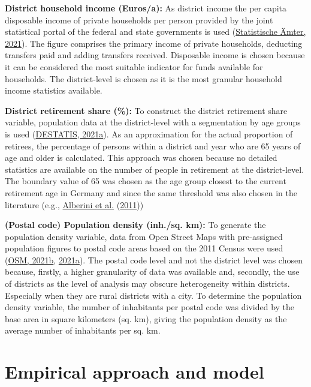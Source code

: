 \documentclass[12pt,twoside]{reedthesis}
\begin{document}
\textbf{District household income (Euros/a):} As district income the per capita disposable income of private households per person provided by the joint statistical portal of the federal and state governments is used (\protect\hyperlink{ref-statistischeamter21}{Statistische Ämter, 2021}). The figure comprises the primary income of private households, deducting transfers paid and adding transfers received. Disposable income is chosen because it can be considered the most suitable indicator for funds available for households. The district-level is chosen as it is the most granular household income statistics available.

\textbf{District retirement share (\%):} To construct the district retirement share variable, population data at the district-level with a segmentation by age groups is used (\protect\hyperlink{ref-destatis21c}{DESTATIS, 2021a}). As an approximation for the actual proportion of retirees, the percentage of persons within a district and year who are 65 years of age and older is calculated. This approach was chosen because no detailed statistics are available on the number of people in retirement at the district-level. The boundary value of 65 was chosen as the age group closest to the current retirement age in Germany and since the same threshold was also chosen in the literature (e.g., \protect\hyperlink{ref-alberini_etal11}{Alberini et al.} (\protect\hyperlink{ref-alberini_etal11}{2011}))

\textbf{(Postal code) Population density (inh./sq. km):} To generate the population density variable, data from Open Street Maps with pre-assigned population figures to postal code areas based on the 2011 Census were used (\protect\hyperlink{ref-osm21}{OSM, 2021b}, \protect\hyperlink{ref-osm21a}{2021a}). The postal code level and not the district level was chosen because, firstly, a higher granularity of data was available and, secondly, the use of districts as the level of analysis may obscure heterogeneity within districts. Especially when they are rural districts with a city. To determine the population density variable, the number of inhabitants per postal code was divided by the base area in square kilometers (sq. km), giving the population density as the average number of inhabitants per sq. km.

\hypertarget{empirical_model}{%
\section{Empirical approach and model}\label{empirical_model}}
\end{document}
